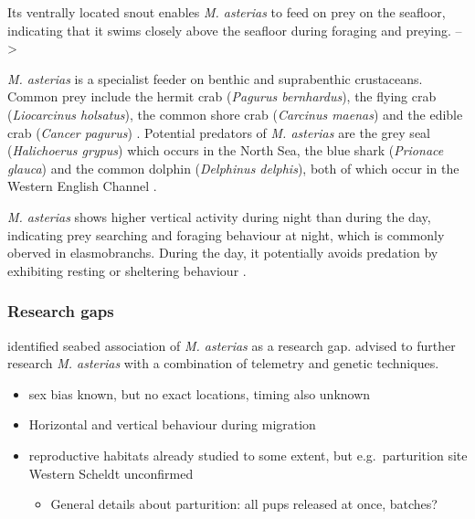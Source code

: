 \documentclass[
  authoryear,
  review,
  3p]{elsarticle}
\providecommand{\tightlist}{%
  \setlength{\itemsep}{0pt}\setlength{\parskip}{0pt}}\usepackage{longtable,booktabs,array}
\begin{document}
Its ventrally located snout enables \emph{M. asterias} to feed on prey
on the seafloor, indicating that it swims closely above the seafloor
during foraging and preying. --\textgreater{}

\emph{M. asterias} is a specialist feeder on benthic and suprabenthic
crustaceans. Common prey include the hermit crab (\emph{Pagurus
bernhardus}), the flying crab (\emph{Liocarcinus holsatus}), the common
shore crab (\emph{Carcinus maenas}) and the edible crab (\emph{Cancer
pagurus}) \citep{mccullyphillips_2015, mccullyphillips_2020}. Potential
predators of \emph{M. asterias} are the grey seal (\emph{Halichoerus
grypus}) which occurs in the North Sea, the blue shark (\emph{Prionace
glauca}) and the common dolphin (\emph{Delphinus delphis}), both of
which occur in the Western English Channel \citep{griffiths_2020}.

\emph{M. asterias} shows higher vertical activity during night than
during the day, indicating prey searching and foraging behaviour at
night, which is commonly oberved in elasmobranchs. During the day, it
potentially avoids predation by exhibiting resting or sheltering
behaviour \citep{griffiths_2020}.

\hypertarget{research-gaps}{%
\subsubsection{Research gaps}\label{research-gaps}}

\citet{griffiths_2020} identified seabed association of \emph{M.
asterias} as a research gap. \citet{breve_2020} advised to further
research \emph{M. asterias} with a combination of telemetry and genetic
techniques.

\begin{itemize}
\tightlist
\item
  sex bias known, but no exact locations, timing also unknown
\item
  Horizontal and vertical behaviour during migration
\end{itemize}

\begin{itemize}
\tightlist
\item
  reproductive habitats already studied to some extent, but
  e.g.~parturition site Western Scheldt unconfirmed

  \begin{itemize}
  \tightlist
  \item
    General details about parturition: all pups released at once,
    batches?
  \end{itemize}
\end{itemize}
\end{document}
